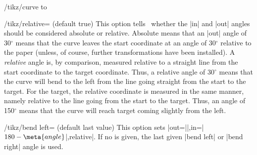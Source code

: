 \begin{key}{/tikz/curve to}
    \begin{key}{/tikz/relative= (default true)}
        This option tells \tikzname\ whether the |in| and |out| angles should
        be considered absolute or relative. Absolute means that an |out| angle
        of 30$^\circ$ means that the curve leaves the start coordinate at an
        angle of 30$^\circ$ relative to the paper (unless, of course, further
        transformations have been installed). A \emph{relative} angle is, by
        comparison, measured relative to a straight line from the start
        coordinate to the target coordinate. Thus, a relative angle of
        30$^\circ$ means that the curve will bend to the left from the line
        going straight from the start to the target. For the target, the
        relative coordinate is measured in the same manner, namely relative to
        the line going from the start to the target. Thus, an angle of
        150$^\circ$ means that the curve will reach target coming slightly from
        the left.
\begin{codeexample}[]
\end{codeexample}

\begin{codeexample}[]
\end{codeexample}
    \end{key}

    \begin{key}{/tikz/bend left= (default \normalfont last value)}
        This option sets |out=||,in=|$180-\meta{angle}$|,relative|.
        If no  is given, the last given |bend left| or |bend right|
        angle is used.
\begin{codeexample}[preamble={\usetikzlibrary{automata,positioning}}]
\end{codeexample}
\end{key}
\end{key}
